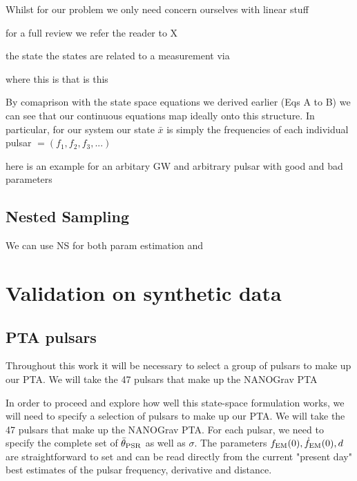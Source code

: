 \documentclass[fleqn,usenatbib,useAMS]{mnras}
\begin{document}
Whilst for our problem we only need concern ourselves with linear stuff

%
for a full review we refer the reader to X





the state the states are related to a measurement via

where this is that is this



By comaprison with the state space equations we derived earlier (Eqs A to B) we can see that our continuous equations map ideally onto this structure. In particular, for our system our state $\bar{x}$ is simply the frequencies of each individual pulsar $= (f_1, f_2, f_3,...)$



here is an example for an arbitary GW and arbitrary pulsar with good and bad parameters 
\subsection{Nested Sampling}

We can use NS for both param estimation and 



\section{Validation on synthetic data}








\subsection{PTA pulsars}
Throughout this work it will be necessary to select a group of pulsars to make up our PTA. We will take the 47 pulsars that make up the NANOGrav PTA \citep{2020ApJ...905L..34A}





In order to proceed and explore how well this state-space formulation works, we will need to specify a selection of pulsars to make up our PTA. We will take the 47 pulsars that make up the NANOGrav PTA. For each pulsar, we need to specify the complete set of $\bar{\theta}_{\rm PSR}$ as well as $\sigma$. The parameters $f_{\rm EM}(0), \dot{f}_{\rm EM}(0),d$ are straightforward to set and can be read directly from  the current "present day" best estimates of the pulsar frequency, derivative and distance. 
\end{document}
